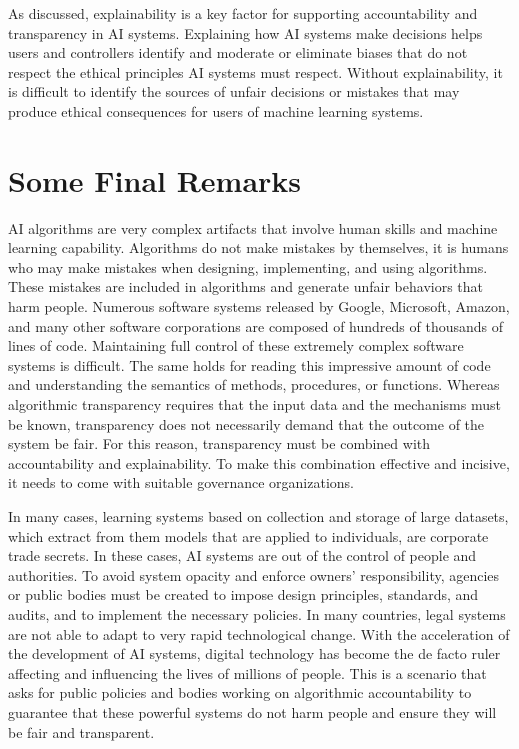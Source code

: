 As discussed, explainability is a key factor for supporting accountability and transparency in AI systems. Explaining how AI systems make decisions helps users and controllers identify and moderate or eliminate biases that do not respect the ethical principles AI systems must respect. Without explainability,\vadjust{\vspace*{14pt}\pagebreak} it is difficult to identify the sources of unfair decisions or mistakes that may produce ethical consequences for users of machine learning systems.

\section{\label{sec:10.4}Some Final Remarks}

AI algorithms are very complex artifacts that involve human skills and machine learning capability. Algorithms do not make mistakes by themselves, it is humans who may make mistakes when designing, implementing, and using algorithms. These mistakes are included in algorithms and generate unfair behaviors that harm people. Numerous software systems released by Google, Microsoft, Amazon, and many other software corporations are composed of hundreds of thousands of lines of code. Maintaining full control of these extremely complex software systems is difficult. The same holds for reading this impressive amount of code and understanding the semantics of methods, procedures, or functions. Whereas algorithmic transparency requires that the input data and the mechanisms must be known, transparency does not necessarily demand that the outcome of the system be fair. For this reason, transparency must be combined with accountability and explainability. To make this combination effective and incisive, it needs to come with suitable governance organizations.

In many cases, learning systems based on collection and storage of large datasets, which extract from them models that are applied to individuals, are corporate trade secrets. In these cases, AI systems are out of the control of people and authorities. To avoid system opacity and enforce owners' responsibility, agencies or public bodies must be created to impose design principles, standards, and audits, and to implement the necessary policies. In many countries, legal systems are not able to adapt to very rapid technological change. With the acceleration of the development of AI systems, digital technology has become the de facto ruler affecting and influencing the lives of millions of people. This is a scenario that asks for public policies and bodies working on algorithmic accountability to guarantee that these powerful systems do not harm people and ensure they will be fair and transparent.

